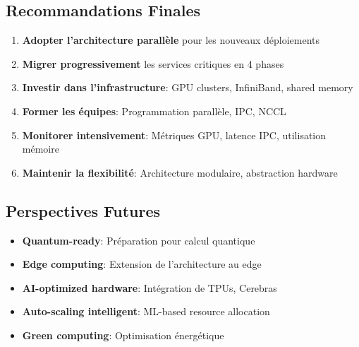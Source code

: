 \documentclass[12pt,a4paper]{article}
\begin{document}
\subsection{Recommandations Finales}

\begin{enumerate}
    \item \textbf{Adopter l'architecture parallèle} pour les nouveaux déploiements
    \item \textbf{Migrer progressivement} les services critiques en 4 phases
    \item \textbf{Investir dans l'infrastructure}: GPU clusters, InfiniBand, shared memory
    \item \textbf{Former les équipes}: Programmation parallèle, IPC, NCCL
    \item \textbf{Monitorer intensivement}: Métriques GPU, latence IPC, utilisation mémoire
    \item \textbf{Maintenir la flexibilité}: Architecture modulaire, abstraction hardware
\end{enumerate}

\subsection{Perspectives Futures}

\begin{itemize}
    \item \textbf{Quantum-ready}: Préparation pour calcul quantique
    \item \textbf{Edge computing}: Extension de l'architecture au edge
    \item \textbf{AI-optimized hardware}: Intégration de TPUs, Cerebras
    \item \textbf{Auto-scaling intelligent}: ML-based resource allocation
    \item \textbf{Green computing}: Optimisation énergétique
\end{itemize}

\vspace{1cm}

\begin{center}
\end{center}
\end{document}
